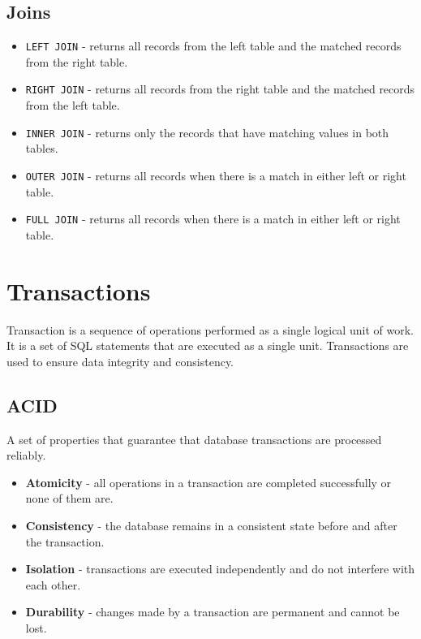 \documentclass{article}
\newcommand{\code}[1]{\colorbox{light-gray}{\texttt{#1}}}
\begin{document}
\subsection{Joins}
\noindent

\begin{itemize}
  \item \code{LEFT JOIN} - returns all records from the left table and the matched records from the right table.
  \item \code{RIGHT JOIN} - returns all records from the right table and the matched records from the left table.
  \item \code{INNER JOIN} - returns only the records that have matching values in both tables.
  \item \code{OUTER JOIN} - returns all records when there is a match in either left or right table.
  \item \code{FULL JOIN} - returns all records when there is a match in either left or right table.
\end{itemize}

\section{Transactions}
\noindent

Transaction is a sequence of operations performed as a single logical unit of work. It is a set of SQL statements that are executed as a single unit. Transactions are used to ensure data integrity and consistency.

\subsection{ACID}
\noindent

A set of properties that guarantee that database transactions are processed reliably.

\begin{itemize}
    \item \textbf{Atomicity} - all operations in a transaction are completed successfully or none of them are.
    \item \textbf{Consistency} - the database remains in a consistent state before and after the transaction.
    \item \textbf{Isolation} - transactions are executed independently and do not interfere with each other.
    \item \textbf{Durability} - changes made by a transaction are permanent and cannot be lost.
\end{itemize}
\end{document}
